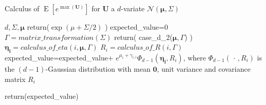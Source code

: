 \documentclass[
]{article}
\begin{document}
\begin{algorithm}[H]
\caption{Calculus of $\operatorname{E}[e^{\max (\boldsymbol{U})}]$ for $\boldsymbol{U}$ a $d$-variate $\mathcal{N}(\boldsymbol{\mu}, \Sigma)$}
\begin{algorithmic}[1]
 {$d,\Sigma,\boldsymbol{\mu}$} 
    \State return($\exp(\mu+\Sigma/2)$ ) 
\Else 
\State expected\_value=0
\State $\Gamma=matrix\_transformation(\Sigma)$
 \State return( case\_d\_2($\boldsymbol{\mu},\Gamma$)    )
\Else 
{}
\State $\boldsymbol{\eta_i}=calculus\_of\_eta(i,\boldsymbol{\mu},\Gamma)$
\State  $R_i=calculus\_of\_R(i,\Gamma)$
\State expected\_value=expected\_value+ $ e^{\mu_i+\gamma_{i,i}} \Phi_{d-1}(\boldsymbol{\eta_i},R_i)$, where $\Phi_{d-1}(\,\cdot\,, R_i)$ is the $(d-1)$-Gaussian distribution with mean $\boldsymbol{0}$, unit variance and covariance matrix $R_i$ 
\EndFor
\EndIf 

\EndIf
\State return(expected\_value)
\EndFunction
\end{algorithmic}
\end{algorithm}
\end{document}
